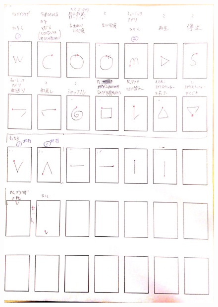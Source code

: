 \begin{figure} [p]
 \begin{center}
  \includegraphics [width=1.0\columnwidth]{img/P3.eps}
  \label{fig:elicitation_example}
 \end{center}
\end{figure}

